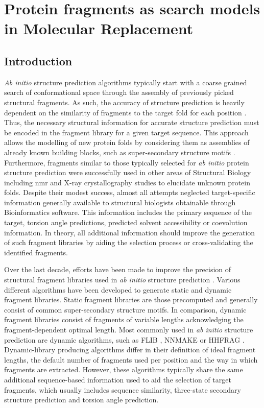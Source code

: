 \chapter{Protein fragments as search models in Molecular Replacement} \label{chap:ample_flib}
\clearpage

\section{Introduction}
\textit{Ab initio} structure prediction algorithms typically start with a coarse grained search of conformational space through the assembly of previously picked structural fragments. As such, the accuracy of structure prediction is heavily dependent on the similarity of fragments to the target fold for each position \cite{Gront2011-sv}. Thus, the necessary structural information for accurate structure prediction must be encoded in the fragment library for a given target sequence. This approach allows the modelling of new protein folds by considering them as assemblies of already known building blocks, such as super-secondary structure motifs \cite{Fernandez-Fuentes2010-ea}. Furthermore, fragments similar to those typically selected for \textit{ab initio} protein structure prediction were successfully used in other areas of Structural Biology including \gls{nmr} \cite{Delaglio2000-fx,Kontaxis2005-ea} and X-ray crystallography \cite{Jones1986-rd} studies to elucidate unknown protein folds. Despite their modest success, almost all attempts neglected target-specific information generally available to structural biologists obtainable through Bioinformatics software. This information includes the primary sequence of the target, torsion angle predictions, predicted solvent accessibility or coevolution information. In theory, all additional information should improve the generation of such fragment libraries by aiding the selection process or cross-validating the identified fragments.

Over the last decade, efforts have been made to improve the precision of structural fragment libraries used in \textit{ab initio} structure prediction \cite{Abbass2015-qk,Shen2013-wh,Li2008-xu,Kalev2011-sz,Bhattacharya2016-ix,Wang2017-ka,De_Oliveira2015-kb,Gront2011-sv}. Various different algorithms have been developed to generate static and dynamic fragment libraries. Static fragment libraries are those precomputed and generally consist of common super-secondary structure motifs. In comparison, dynamic fragment libraries consist of fragments of variable lengths acknowledging the fragment-dependent optimal length. Most commonly used in \textit{ab initio} structure prediction are dynamic algorithms, such as FLIB \cite{De_Oliveira2015-kb}, NNMAKE \cite{Gront2011-sv} or HHFRAG \cite{Kalev2011-sz}. Dynamic-library producing algorithms differ in their definition of ideal fragment lengths, the default number of fragments used per position and the way in which fragments are extracted. However, these algorithms typically share the same additional sequence-based information used to aid the selection of target fragments, which usually includes sequence similarity, three-state secondary structure prediction and torsion angle prediction.

